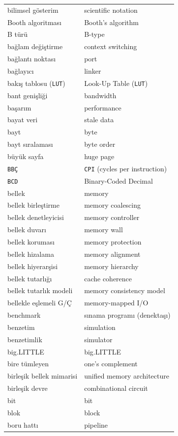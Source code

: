 {\begin{longtable}{@{}p{7.6cm}p{7.6cm}@{}}
bilimsel gösterim & scientific notation \\
Booth algoritması & Booth's algorithm \\
B türü & B-type \\
bağlam değiştirme & context switching \\
bağlantı noktası & port \\
bağlayıcı & linker \\
bakış tablosu (\texttt{LUT}) & Look-Up Table (\texttt{LUT}) \\
bant genişliği & bandwidth \\
başarım & performance \\
bayat veri & stale data \\
bayt & byte \\
bayt sıralaması & byte order \\
büyük sayfa & huge page \\
\texttt{BBÇ} & \texttt{CPI} (cycles per instruction) \\
\texttt{BCD} & Binary-Coded Decimal \\
bellek & memory \\
bellek birleştirme & memory coalescing \\
bellek denetleyicisi & memory controller \\
bellek duvarı & memory wall \\
bellek koruması & memory protection \\
bellek hizalama & memory alignment \\
bellek hiyerarşisi & memory hierarchy \\
bellek tutarlığı & cache coherence \\
bellek tutarlık modeli & memory consistency model \\
bellekle eşlemeli G/Ç & memory-mapped I/O \\
benchmark & sınama programı (denektaşı) \\
benzetim & simulation \\
benzetimlik & simulator \\
big.LITTLE & big.LITTLE \\
bire tümleyen & one's complement \\
birleşik bellek mimarisi & unified memory architecture \\
birleşik devre & combinational circuit \\
bit & bit \\
blok & block \\
boru hattı & pipeline \\

\end{longtable}}
